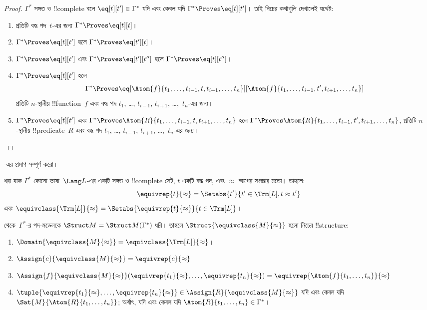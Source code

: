 \documentclass[../../../include/open-logic-section]{subfiles}
\begin{document}
\begin{proof}
$\Gamma^*$ সঙ্গত ও !!{complete} বলে $\eq[t][t'] \in \Gamma^*$ যদি এবং
কেবল যদি $\Gamma^* \Proves \eq[t][t']$। তাই নিচের কথাগুলি দেখালেই যথেষ্ট:
\begin{enumerate}
\item প্রতিটি বদ্ধ পদ~$t$-এর জন্য $\Gamma^* \Proves \eq[t][t]$।
\item $\Gamma^* \Proves \eq[t][t']$ হলে $\Gamma^* \Proves \eq[t'][t]$।
\item $\Gamma^* \Proves \eq[t][t']$ এবং $\Gamma^* \Proves
  \eq[t'][t'']$ হলে $\Gamma^* \Proves \eq[t][t'']$।
\item $\Gamma^* \Proves \eq[t][t']$ হলে
\[
\Gamma^* \Proves
\eq[\Atom{f}{t_1,\dots,t_{i-1},t,t_{i+1},\dots,t_n}][\Atom{f}{t_1,\dots,t_{i-1},t',t_{i+1},\dots,t_n}]
\]
প্রতিটি $n$-স্থানীয় !!{function}~$f$ এবং বদ্ধ পদ $t_1$, \dots,
$t_{i-1}$, $t_{i+1}$, \dots,~$t_n$-এর জন্য।
\item $\Gamma^* \Proves \eq[t][t']$ এবং
$\Gamma^* \Proves
\Atom{R}{t_1,\dots,t_{i-1},t,t_{i+1},\dots,t_n}$ হলে
$\Gamma^* \Proves \Atom{R}{t_1,\dots,t_{i-1},t',t_{i+1},\dots,t_n}$,
প্রতিটি $n$-স্থানীয় !!{predicate}~$R$ এবং বদ্ধ পদ $t_1$, \dots,
$t_{i-1}$, $t_{i+1}$, \dots,~$t_n$-এর জন্য।
\end{enumerate}
\end{proof}

\begin{prob}
-এর প্রমাণ সম্পূর্ণ করো।
\end{prob}

\begin{defn}
ধরা যাক $\Gamma^*$ কোনো ভাষা~$\Lang L$-এর একটি সঙ্গত ও !!{complete}
সেট, $t$ একটি বদ্ধ পদ, এবং $\approx$ আগের সংজ্ঞার মতো। তাহলে:
\[
\equivrep{t}{\approx} = \Setabs{t'}{t'\in \Trm[L], t \approx t'}
\]
এবং $\equivclass{\Trm[L]}{\approx} = \Setabs{\equivrep{t}{\approx}}{t \in \Trm[L]}$।
\end{defn}

\begin{defn}
 থেকে~$\Gamma^*$-র পদ-মডেলকে $\Struct M =
\Struct M(\Gamma^*)$ ধরি। তাহলে $\Struct{\equivclass{M}{\approx}}$ হলো
নিচের !!{structure}:
\begin{enumerate}
\item $\Domain{\equivclass{M}{\approx}} = \equivclass{\Trm[L]}{\approx}$।
\item $\Assign{c}{\equivclass{M}{\approx}} = \equivrep{c}{\approx}$
\item $\Assign{f}{\equivclass{M}{\approx}}(\equivrep{t_1}{\approx}, \dots,
  \equivrep{t_n}{\approx}) = \equivrep{\Atom{f}{t_1,\dots, t_n}}{\approx}$
\item $\tuple{\equivrep{t_1}{\approx}, \dots, \equivrep{t_n}{\approx}} \in
  \Assign{R}{\equivclass{M}{\approx}}$ যদি এবং কেবল যদি
  $\Sat{M}{\Atom{R}{t_1,\dots, t_n}}$; অর্থাৎ, যদি এবং কেবল যদি
  $\Atom{R}{t_1,\dots, t_n} \in \Gamma^*$।
\end{enumerate}
\end{defn}
\end{document}
